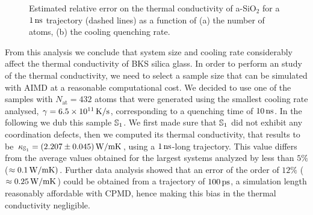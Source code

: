 \begin{figure}[!tb]
    \centering
    \hfill
    \caption{Estimated relative error on the thermal conductivity of a-SiO$_2$ for a $1\,\mathrm{ns}$ trajectory (dashed lines) as a function of (a) the number of atoms, (b) the cooling quenching rate. 
    }
    \label{fig:results-class-kappaerror}
\end{figure}

From this analysis we conclude that system size and cooling rate considerably affect the thermal conductivity of BKS silica glass. 
In order to perform an \abinitio study of the thermal conductivity, we need to select a sample size that can be simulated with AIMD at a reasonable computational cost. 
We decided to use one of the samples with $N_{\mathrm{at}}=432$ atoms that were generated using the smallest cooling rate analysed, $\gamma=6.5\times 10^{11}\,\mathrm{K/s}$, corresponding to a quenching time of $10\,\mathrm{ns}$. In the following we dub this sample $\S1$. 
We first made sure that $\S1$ did not exhibit any coordination defects, then we computed its thermal conductivity, that results to be $\kappa_\S1 = (2.207 \pm 0.045) \un{W/mK}$, using a $1\,\mathrm{ns}$-long trajectory. 
This value differs from the average values obtained for the largest systems analyzed by less than $5\%$ ($\approx 0.1\,\mathrm{W/mK})$. 
Further data analysis showed that an error of the order of $12\%$ ($\approx 0.25\,\mathrm{W/mK}$) could be obtained from a trajectory of $100\,\mathrm{ps}$, a simulation length reasonably affordable with CPMD, hence making this bias in the thermal conductivity negligible. 



